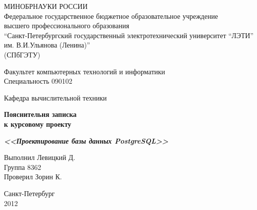 \begin{titlepage}
\newpage

\begin{center}
МИНОБРНАУКИ РОССИИ\\
Федеральное государственное бюджетное образовательное учреждение\\
высшего профессионального образования\\
“Санкт-Петербургский государственный электротехнический университет 
“ЛЭТИ” им. В.И.Ульянова (Ленина)”\\
(СПбГЭТУ)

\hrulefill
\end{center}

\begin{flushleft}
Факультет компьютерных технологий и информатики\\
\vspace{1em}
Специальность 090102\\
\vspace{1em}

Кафедра вычислительной техники
\end{flushleft}

\vspace{10em}


\begin{center}
\Large \textbf{Пояснительня записка \\ к курсовому проекту}
\end{center}

\begin{center}
\large\textit{\textbf{<<Проектирование базы данных PostgreSQL>>}}
\end{center}

\vspace{10em}


\begin{flushleft}
Выполнил Левицкий Д.\\
\vspace{1em}
Группа 8362\\
\vspace{1em}
Проверил Зорин К.
\end{flushleft}

\vspace{\fill}

\begin{center}
Санкт-Петербург\\
2012
\end{center}

\end{titlepage}
